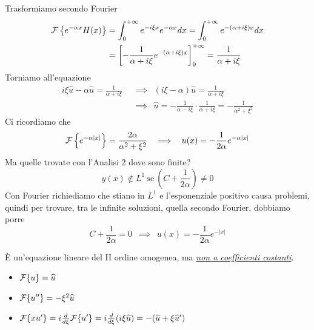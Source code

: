 Trasformiamo secondo Fourier
\begin{equation*}
\begin{aligned}
\mathcal{F} \left\{e^{ - \alpha x} H(x)\right\} & = \int ^{ + \infty }_{0} e^{ - i\xi x} e^{ - \alpha x} dx = \int ^{ + \infty }_{0} e^{ - (\alpha + i\xi) x} dx\\
 & = \left[ - \frac{1}{\alpha + i\xi } e^{ - (\alpha + i\xi) x}\right]^{ + \infty }_{0} = \frac{1}{\alpha + i\xi }
\end{aligned}
\end{equation*}
Torniamo all'equazione
\begin{equation*}
\begin{aligned}
i\xi \hat{u} - \alpha \hat{u} = \frac{1}{\alpha + i\xi } \ \  & \implies \ \ (i\xi - \alpha)\hat{u} = \frac{1}{\alpha + i\xi }\\
 & \implies \ \ \hat{u} = - \frac{1}{\alpha - i\xi } \cdot \frac{1}{\alpha + i\xi } = - \frac{1}{\alpha ^{2} + \xi ^{2}}
\end{aligned}
\end{equation*}
Ci ricordiamo che
\begin{equation*}
\mathcal{F} \left\{e^{ - \alpha | x| }\right\} = \frac{2\alpha }{\alpha ^{2} + \xi ^{2}} \ \ \implies \ \ u(x) = - \frac{1}{2\alpha } e^{ - \alpha | x| }
\end{equation*}
Ma quelle trovate con l'Analisi 2 dove sono finite?
\begin{equation*}
y(x) \notin L^{1} \ \text{se} \ \left(C + \frac{1}{2\alpha }\right) \neq 0
\end{equation*}
Con Fourier richiediamo che stiano in $L^{1}$ e l'esponenziale positivo causa problemi, quindi per trovare, tra le infinite soluzioni, quella secondo Fourier, dobbiamo porre
\begin{equation*}
C + \frac{1}{2\alpha } = 0\ \ \implies \ \ u(x) = - \frac{1}{2\alpha } e^{ - | x| }
\end{equation*}
\Soluzione

È un'equazione lineare del II ordine omogenea, ma \textit{\underline{non a coefficienti costanti}}.
\begin{itemize}
\item $\mathcal{F} \{u\} = \widehat{u}$
\item $\mathcal{F} \{u''\} = - \xi ^{2}\widehat{u}$
\item $\mathcal{F} \{xu'\} = i\frac{d}{d\xi }\mathcal{F} \{u'\} = i\frac{d}{d\xi }(i\xi \widehat{u}) = - (\widehat{u} + \xi \widehat{u} ')$
\end{itemize}

